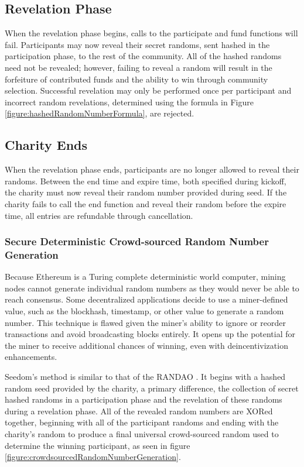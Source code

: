 \documentclass[11pt]{article}
\begin{document}
\subsection{Revelation Phase}

When the revelation phase begins, calls to the participate and fund functions will fail. Participants may now reveal their secret randoms, sent hashed in the participation phase, to the rest of the community. All of the hashed randoms need not be revealed; however, failing to reveal a random will result in the forfeiture of contributed funds and the ability to win through community selection. Successful revelation may only be performed once per participant and incorrect random revelations, determined using the formula in Figure \ref{figure:hashedRandomNumberFormula}, are rejected.

\subsection{Charity Ends}

When the revelation phase ends, participants are no longer allowed to reveal their randoms. Between the end time and expire time, both specified during kickoff, the charity must now reveal their random number provided during seed. If the charity fails to call the end function and reveal their random before the expire time, all entries are refundable through cancellation.

\subsubsection{Secure Deterministic Crowd-sourced Random Number Generation}

Because Ethereum is a Turing complete deterministic world computer, mining nodes cannot generate individual random numbers as they would never be able to reach consensus. Some decentralized applications decide to use a miner-defined value, such as the blockhash, timestamp, or other value to generate a random number. This technique is flawed given the miner's ability to ignore or reorder transactions and avoid broadcasting blocks entirely. It opens up the potential for the miner to receive additional chances of winning, even with deincentivization enhancements.

Seedom's method is similar to that of the RANDAO \cite{2}. It begins with a hashed random seed provided by the charity, a primary difference, the collection of secret hashed randoms in a participation phase and the revelation of these randoms during a revelation phase. All of the revealed random numbers are XORed together, beginning with all of the participant randoms and ending with the charity's random to produce a final universal crowd-sourced random used to determine the winning participant, as seen in figure \ref{figure:crowdsourcedRandomNumberGeneration}.
\end{document}
